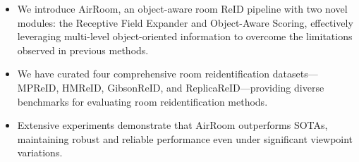 \begin{itemize}[leftmargin=2em]
    \item We introduce AirRoom, an object-aware room ReID pipeline with two novel modules: the Receptive Field Expander and Object-Aware Scoring, effectively leveraging multi-level object-oriented information to overcome the limitations observed in previous methods.
    \item We have curated four comprehensive room reidentification datasets—MPReID, HMReID, GibsonReID, and ReplicaReID—providing diverse benchmarks for evaluating room reidentification methods.
    \item Extensive experiments demonstrate that AirRoom outperforms SOTAs, maintaining robust and reliable performance even under significant viewpoint variations.
\end{itemize}
